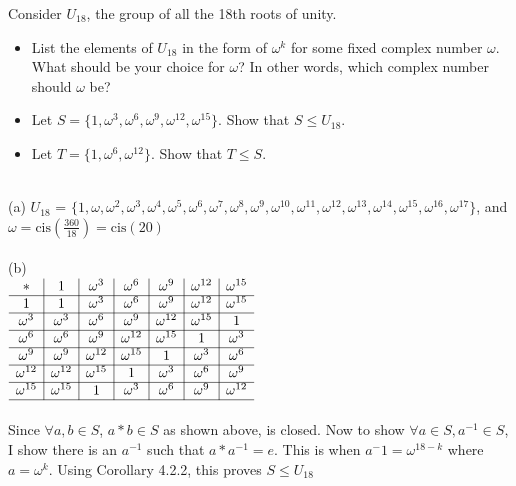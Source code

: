 \documentclass[titlepage]{article}
\newenvironment{problem}[2][Problem]{\begin{trivlist}
\item[\hskip \labelsep {\bfseries #1}\hskip \labelsep {\bfseries #2.}]}{\end{trivlist}}
\begin{document}
\begin{problem}{5}
Consider $U_{18}$, the group of all the 18th roots of unity.
\begin{itemize}
\item[(a)] List the elements of $U_{18}$ in the form of $\omega^k$ for some fixed complex number $\omega$. What should be your choice for $\omega$? In other words, which complex number should $\omega$ be?
\item[(b)] Let $S=\{1,\omega^3,\omega^6,\omega^9,\omega^{12},\omega^{15}\}$. Show that $S \leq U_{18}$.
\item[(c)] Let $T = \{1,\omega^6,\omega^{12}\}.$ Show that $T\leq S$.
\end{itemize}
\hrulefill \\
(a) $U_{18}$ = $\{1,\omega ,\omega^2,\omega^3,\omega^4,\omega^5,\omega^6,\omega^7,\omega^8,\omega^9,\omega^{10},\omega^{11},\omega^{12},\omega^{13},\omega^{14},\omega^{15},\omega^{16},\omega^{17}\}$, and $\omega = \text{cis}(\frac{360}{18}) = \text{cis}(20)$
 \\ \\
(b)\\ $\begin{array}{c|c|c|c|c|c|c}
* & 1 & \omega^{3} & \omega^{6} & \omega^{9} & \omega^{12} & \omega^{15}\\\hline
1 & 1 & \omega^{3} & \omega^{6} & \omega^{9} & \omega^{12} & \omega^{15}\\\hline
\omega^{3} &\omega^{3}& \omega^{6} & \omega^{9} & \omega^{12} & \omega^{15} & 1 \\\hline
\omega^{6} & \omega^{6} & \omega^{9} & \omega^{12} & \omega^{15} & 1 & \omega^{3} \\\hline
\omega^{9} & \omega^{9 }& \omega^{12} & \omega^{15} & 1 & \omega^{3} & \omega^{6} \\\hline
\omega^{12} &\omega^{12} &\omega^{15} & 1 & \omega^{3} & \omega^{6} & \omega^{9} \\\hline
\omega^{15} & \omega^{15} & 1 & \omega^{3} & \omega^{6} & \omega^{9} & \omega^{12} \\\hline
 \end{array}$ \\ \\
Since $\forall a,b \in S$, $a*b \in S$ as shown above, is closed. Now to show $\forall a \in S, a^{-1} \in S$, I show there is an $a^{-1}$ such that $a*a^{-1} = e$. This is when $a^-1 = \omega^{18-k}$ where $a=\omega^k$. Using Corollary 4.2.2, this proves $S\leq U_{18}$
\\ \\

\end{problem}
\end{document}
